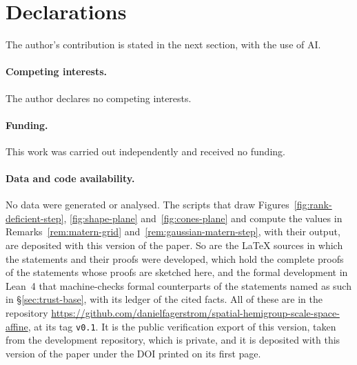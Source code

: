 
\section*{Declarations}

The author's contribution is stated in the next section, with the use of AI.

\paragraph{Competing interests.} The author declares no competing interests.

\paragraph{Funding.} This work was carried out independently and received no funding.

\paragraph{Data and code availability.} No data were generated or analysed. The scripts that draw
Figures~\ref{fig:rank-deficient-step}, \ref{fig:shape-plane} and~\ref{fig:cones-plane} and compute the values in
Remarks~\ref{rem:matern-grid} and~\ref{rem:gaussian-matern-step}, with their output, are deposited
with this version of the paper. So are the LaTeX sources in which the statements and their proofs
were developed, which hold the complete proofs of the statements whose proofs are sketched here, and
the formal development in Lean~4 that machine-checks formal counterparts of the statements named as
such in \S\ref{sec:trust-base}, with its ledger of the cited facts.
All of these are in the repository \url{https://github.com/danielfagerstrom/spatial-hemigroup-scale-space-affine}, at its tag
\texttt{v0.1}. It is the public verification export of this version, taken from the
development repository, which is private, and it is deposited with this version of the paper under
the DOI printed on its first page.
